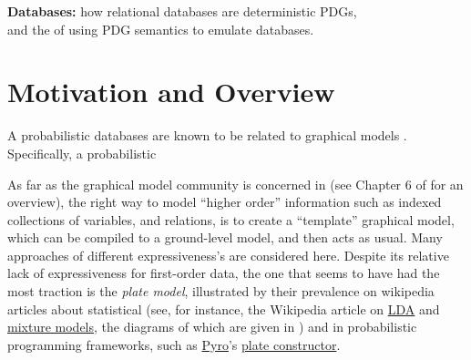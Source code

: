 \documentclass{article}
\theoremstyle{definition}
\theoremstyle{remark}
\begin{document}
\begin{center}
  \textbf{ \Large Databases:} how relational databases are deterministic PDGs,\\
  and the of using PDG semantics to emulate databases.
\end{center}

\section{Motivation and Overview}

A probabilistic databases are known to be related to graphical models \cite{suciu2011probabilistic}. Specifically, a probabilistic 

As far as the graphical model community is concerned in (see Chapter 6 of \cite{KF09} for an overview), the right way to model ``higher order'' information such as indexed collections of variables, and relations, is to create a ``template'' graphical model, which can be compiled to a ground-level model, and then acts as usual. Many approaches of different expressiveness's are considered here. Despite its relative lack of expressiveness for first-order data, the one that seems to have had the most traction is the \emph{plate model}, illustrated by their prevalence on wikipedia articles about statistical (see, for instance, the Wikipedia article on \href{https://en.wikipedia.org/wiki/Latent_Dirichlet_allocation}{LDA} and \href{https://en.wikipedia.org/wiki/Mixture_model}{mixture models}, the diagrams of which are given in )
and in probabilistic programming frameworks, such as \href{https://pyro.ai/}{Pyro}'s \href{http://docs.pyro.ai/en/0.3.0-release/primitives.html#pyro.plate}{plate constructor}.
\end{document}
